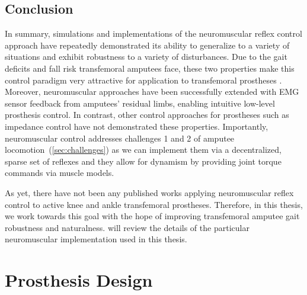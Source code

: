 \subsection{Conclusion} 
In summary, simulations and implementations of the neuromuscular reflex control
approach have repeatedly demonstrated its ability to generalize to a variety of
situations and exhibit robustness to a variety of disturbances. Due to the gait
deficits and fall risk transfemoral amputees face, these two properties make
this control paradigm very attractive for application to transfemoral prostheses
. Moreover, neuromuscular approaches have been successfully extended with EMG
sensor feedback from amputees' residual limbs, enabling intuitive low-level
prosthesis control. In contrast, other control approaches for prostheses such as
impedance control have not demonstrated these properties. Importantly,
neuromuscular control addresses challenges 1 and 2 of amputee
locomotion~(\cref{sec:challenges}) as we can implement them via a decentralized,
sparse set of reflexes and they allow for dynamism by providing joint torque
commands via muscle models.

As yet, there have not been any published works applying neuromuscular reflex
control to active knee and ankle transfemoral prostheses. Therefore, in this
thesis, we work towards this goal with the hope of improving transfemoral
amputee gait robustness and naturalness.  will review the
details of the particular neuromuscular implementation used in this thesis.

\section{Prosthesis Design}\label{sec:pros_design}

